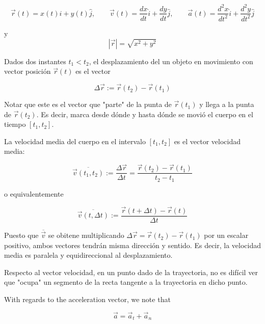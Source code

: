 \documentclass[12pt]{article}
\theoremstyle{definition}
\begin{document}
\begin{equation}
    \vec{r}(t) = x(t) \hat{i} + y(t) \hat{j}, \qquad \vec{v}(t) = \frac{dx}{dt}
    \hat{i} + \frac{dy}{dt} \hat{j}, \qquad \vec{a}(t) = \frac{d^2 x}{dt^2}
    \hat{i} + \frac{d^2 y}{dt^2} \hat{j}
\end{equation}

y \begin{equation}
    \left| \vec{r} \right| = \sqrt{x^2 + y^2}
\end{equation}

Dados dos instantes $t_1 < t_2$, el desplazamiento del un objeto en movimiento
con vector posición $\vec{r}(t)$ es el vector 

\begin{equation*}
    \Delta\vec{r} := \vec{r}(t_2) - \vec{r}(t_1)
\end{equation*}

Notar que este es el vector que "parte" de la punta de $\vec{r}(t_1)$ y llega a
la punta de $\vec{r}(t_2)$. Es decir, marca desde dónde y hasta dónde se movió
el cuerpo en el tiempo $[t_1, t_2]$.

La velocidad media del cuerpo en el intervalo $[t_1, t_2]$ es el vector
velocidad media: 

\begin{equation*}
    \overline{\vec{v}(t_1, t_2)} := \frac{\Delta \vec{r}}{\Delta t} = \frac{\vec{r}(t_2) -
\vec{r}(t_1)}{t_2 - t_1}
\end{equation*}

o equivalentemente 

\begin{equation}
    \overline{\vec{v}(t, \Delta t)} := \frac{\vec{r}(t + \Delta t) - \vec{r}(t)}{\Delta t}
\end{equation}

Puesto que $\overline{\vec{v}}$ se obitene multiplicando $\Delta \vec{r} =
\vec{r}(t_2) - \vec{r}(t_1)$ por un escalar positivo, ambos vectores tendrán
misma dirección y sentido.  Es decir, la velocidad media es paralela y
equidireccional al desplazamiento.

Respecto al vector velocidad, en un punto dado de la trayectoria, no es difícil
ver que "ocupa" un segmento de la recta tangente a la trayectoria en dicho
punto. 

With regards to the acceleration vector, we note that 

\begin{equation*}
    \vec{a} = \vec{a}_t + \vec{a}_n
\end{equation*}
\end{document}
